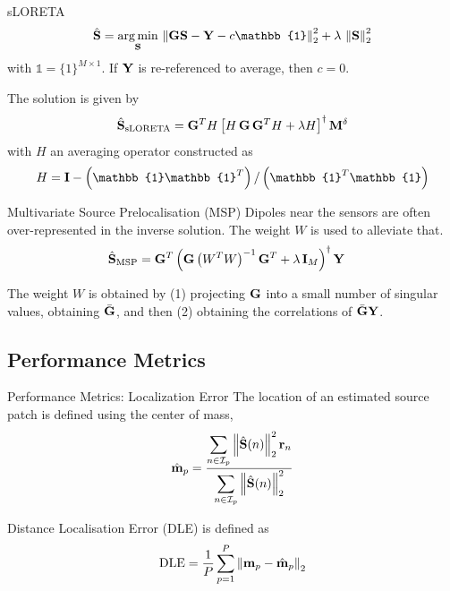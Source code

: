 \documentclass[progressbar=head]{beamer}
\begin{document}
\begin{frame}{sLORETA}
\begin{equation}
    \hat{\mathbf{S}} = \argmin_{\mathbf{S}}\, \nnorm{\G \mathbf{S}-\Y-c \mathbb{1}}_2^2 + \lambda\, \nnorm{\mathbf{S}}_2^2
\end{equation}
with $\mathbb{1}=\{1\}^{M\times 1}$.
If $\mathbf{Y}$ is re-referenced to average, then $c=0$.


The solution is given by
\begin{equation}
    \hat{\mathbf{S}}_{\text{sLORETA}}
    =
    \mathbf{G}^T H\left[ H\, \mathbf{G}\, \mathbf{G}^T H+ \lambda H \right]^{\dagger}
    \mathbf{M}^\delta
\end{equation}
with $H$ an averaging operator constructed as
\begin{equation*}
    H = \id - \ppar{\mathbb{1} \mathbb{1}^T}/\ppar{\mathbb{1}^T \mathbb{1}}
\end{equation*}

\end{frame}

\begin{frame}{Multivariate Source Prelocalisation (MSP)}
Dipoles near the sensors are often over-represented in the inverse solution. The weight $W$ is used to alleviate that.
\begin{align}
\hat{\mathbf{S}}_\text{MSP} 
&=
\mathbf{G}^T
\left( \mathbf{G} \left( W^T W \right)^{-1} \mathbf{G}^T + \lambda\, \mathbf{I}_M \right)^\dagger \mathbf{Y}
\end{align}

The weight $W$ is obtained by (1) projecting $\mathbf{G}$ into a small number of singular values, obtaining $\bar{\mathbf{G}}$, and then (2) obtaining the correlations of $\bar{\mathbf{G}} \mathbf{Y}$.
\end{frame}


\subsection{Performance Metrics}

\begin{frame}{Performance Metrics: Localization Error}
The location of an estimated source patch is defined using the center of mass,
\begin{equation}
    \hat{\mathbf{m}}_p = 
\frac{\displaystyle \sum_{n\in \mathcal{I}_p} \left\lVert \hat{\mathbf{S}}(n) \right\rVert_2^2 \mathbf{r}_n }{\displaystyle \sum_{n\in \mathcal{I}_p} \left\lVert \hat{\mathbf{S}}(n) \right\rVert_2^2}
\end{equation}

Distance Localisation Error (DLE) is defined as
\begin{equation}
\text{DLE} = 
\frac{1}{P} \sum_{p=1}^P \left\lVert  \mathbf{m}_p - \hat{\mathbf{m}}_p  \right\rVert_2
\label{def:DLE}
\end{equation}
\end{frame}
\end{document}

